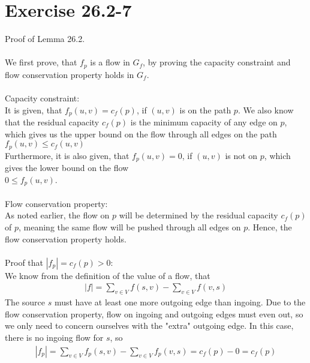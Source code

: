 \section{Exercise 26.2-7}
Proof of Lemma 26.2.
\\
\\
We first prove, that $f_p$ is a flow in $G_f$, by proving the capacity constraint and flow conservation property holds in $G_f$.
\\
\\
Capacity constraint:
\\
It is given, that $f_p(u,v)=c_f(p)$, if $(u,v)$ is on the path $p$. We also know that the residual capacity $c_f(p)$ is the minimum capacity of any edge on $p$, which gives us the upper bound on the flow through all edges on the path
\\
$f_p(u,v)\leq c_f(u,v)$
\\
Furthermore, it is also given, that $f_p(u,v)=0$, if $(u,v)$ is not on $p$, which gives the lower bound on the flow
\\
$0 \leq f_p(u,v)$.
\\
\\
Flow conservation property:
\\
As noted earlier, the flow on $p$ will be determined by the residual capacity $c_f(p)$ of $p$, meaning the same flow will be pushed through all edges on $p$. Hence, the flow conservation property holds.
\\
\\
Proof that $|f_p| = c_f(p)>0$:
\\
We know from the definition of the value of a flow, that 
\begin{align}
|f| = \sum_{v\in V}f(s,v) - \sum_{v\in V}f(v,s)
\end{align}
The source $s$ must have at least one more outgoing edge than ingoing. Due to the flow conservation property, flow on ingoing and outgoing edges must even out, so we only need to concern ourselves with the "extra" outgoing edge. In this case, there is no ingoing flow for $s$, so
\begin{align}
|f_p| = \sum_{v\in V}f_p(s,v) - \sum_{v\in V}f_p(v,s) = c_f(p) - 0 = c_f(p)
\end{align}